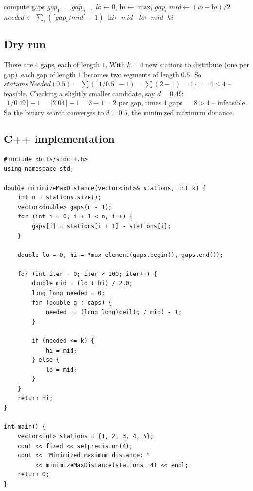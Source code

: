 \begin{algorithm}[H]
\caption{Minimize Maximum Gas Station Distance}
\begin{algorithmic}[1]
  \State compute gaps $\textit{gap}_1, \dots, \textit{gap}_{n-1}$
  \State $\textit{lo} \gets 0$, $\textit{hi} \gets \max_i \textit{gap}_i$
    \State $\textit{mid} \gets (\textit{lo}+\textit{hi})/2$
    \State $\textit{needed} \gets \sum_i (\lceil \textit{gap}_i / \textit{mid} \rceil - 1)$
      \State $\textit{hi} \gets \textit{mid}$
    \Else
      \State $\textit{lo} \gets \textit{mid}$
    \EndIf
  \EndFor
  \State \Return \textit{hi}
\EndProcedure
\end{algorithmic}
\end{algorithm}

\subsection*{Dry run}


There are $4$ gaps, each of length $1$. With $k=4$ new stations to
distribute (one per gap), each gap of length $1$ becomes two segments of
length $0.5$. So $\textit{stationsNeeded}(0.5) = \sum (\lceil 1/0.5
\rceil - 1) = \sum (2-1) = 4 \cdot 1 = 4 \le 4$ -- feasible. Checking a
slightly smaller candidate, say $d=0.49$:
$\lceil 1/0.49 \rceil - 1 = \lceil 2.04 \rceil - 1 = 3-1=2$ per gap, times
$4$ gaps $=8 > 4$ -- infeasible. So the binary search converges to
$d = 0.5$, the minimized maximum distance.

\subsection*{C++ implementation}

\begin{lstlisting}
#include <bits/stdc++.h>
using namespace std;

double minimizeMaxDistance(vector<int>& stations, int k) {
    int n = stations.size();
    vector<double> gaps(n - 1);
    for (int i = 0; i + 1 < n; i++) {
        gaps[i] = stations[i + 1] - stations[i];
    }

    double lo = 0, hi = *max_element(gaps.begin(), gaps.end());

    for (int iter = 0; iter < 100; iter++) {
        double mid = (lo + hi) / 2.0;
        long long needed = 0;
        for (double g : gaps) {
            needed += (long long)ceil(g / mid) - 1;
        }

        if (needed <= k) {
            hi = mid;
        } else {
            lo = mid;
        }
    }
    return hi;
}

int main() {
    vector<int> stations = {1, 2, 3, 4, 5};
    cout << fixed << setprecision(4);
    cout << "Minimized maximum distance: "
         << minimizeMaxDistance(stations, 4) << endl;
    return 0;
}
\end{lstlisting}

